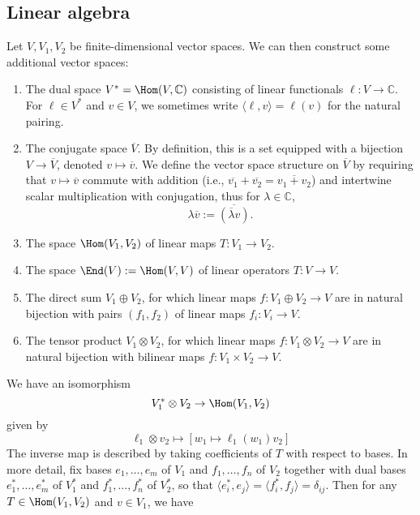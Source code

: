 \documentclass[reqno]{amsart} 
\begin{document}
\subsection{Linear algebra}\label{sec:linear-algebra}
Let $V, V_1, V_2$ be finite-dimensional vector spaces.  We can then construct some additional vector spaces:
\begin{enumerate}
\item The dual space $V^* = \Hom(V,\mathbb{C})$ consisting of linear functionals $\ell : V \rightarrow \mathbb{C}$.  For $\ell \in V^*$ and $v \in V$, we sometimes write $\langle \ell, v \rangle = \ell(v)$ for the natural pairing.
\item The conjugate space $\overline{V}$.  By definition, this is a set equipped with a bijection $V \rightarrow \overline{V}$, denoted $v \mapsto \overline{v}$.  We define the vector space structure on $\overline{V}$ by requiring that $v \mapsto \overline{v}$ commute with addition (i.e., $\overline{v_1} + \overline{v_2} = \overline{v_1 + v_2}$) and intertwine scalar multiplication with conjugation, thus for $\lambda \in \mathbb{C}$,
  \begin{equation*}
    \lambda \overline{v} := \overline{(\overline{\lambda} v )}.
  \end{equation*}
\item The space $\Hom(V_1,V_2)$ of linear maps $T : V_1 \rightarrow V_2$.
\item The space $\End(V) := \Hom(V,V)$ of linear operators $T : V \rightarrow V$.
\item The direct sum $V_1 \oplus V_2$, for which linear maps $f : V_1 \oplus V_2 \rightarrow V$ are in natural bijection with pairs $(f_1,f_2)$ of linear maps $f_i : V_i \rightarrow V$.
\item The tensor product $V_1 \otimes V_2$, for which linear maps $f : V_1 \otimes V_2 \rightarrow V$ are in natural bijection with bilinear maps $f : V_1 \times V_2 \rightarrow V$.
\end{enumerate}
We have an isomorphism
\begin{equation*}
  V_1^* \otimes V_2 \rightarrow \Hom(V_1,V_2)
\end{equation*}
given by
\begin{equation*}
  \ell_1 \otimes v_2 \mapsto [w_1 \mapsto \ell_1(w_1) v_2]
\end{equation*}
The inverse map is described by taking coefficients of $T$ with respect to bases.  In more detail, fix bases $e_1,\dotsc,e_m$ of $V_1$ and $f_1,\dotsc,f_n$ of $V_2$ together with dual bases $e_1^*, \dotsc, e_m^*$ of $V_1^*$ and $f_1^*, \dotsc, f_n^*$ of $V_2^*$, so that $\langle e_i^*, e_j \rangle = \langle f_i^*, f_j \rangle = \delta_{i j}$.  Then for any $T \in \Hom(V_1,V_2)$ and $v \in V_1$, we have
\end{document}
